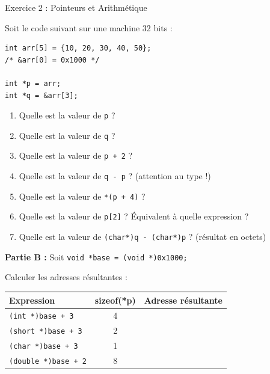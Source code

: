 \documentclass[10pt,a4paper]{article}
\begin{document}
\begin{exercicebox}{Exercice 2 : Pointeurs et Arithmétique}

Soit le code suivant sur une machine 32 bits :

\begin{lstlisting}[numbers=none]
int arr[5] = {10, 20, 30, 40, 50};
/* &arr[0] = 0x1000 */

int *p = arr;
int *q = &arr[3];
\end{lstlisting}

\begin{enumerate}[label=\alph*)]
    \item Quelle est la valeur de \texttt{p} ?
    \item Quelle est la valeur de \texttt{q} ?
    \item Quelle est la valeur de \texttt{p + 2} ?
    \item Quelle est la valeur de \texttt{q - p} ? (attention au type !)
    \item Quelle est la valeur de \texttt{*(p + 4)} ?
    \item Quelle est la valeur de \texttt{p[2]} ? Équivalent à quelle expression ?
    \item Quelle est la valeur de \texttt{(char*)q - (char*)p} ? (résultat en octets)
\end{enumerate}

\textbf{Partie B :} Soit \texttt{void *base = (void *)0x1000;}

Calculer les adresses résultantes :

\begin{center}
\renewcommand{\arraystretch}{1.3}
\begin{tabular}{|l|c|l|}
\hline
\textbf{Expression} & \textbf{sizeof(*p)} & \textbf{Adresse résultante} \\
\hline
\texttt{(int *)base + 3} & 4 & \\
\hline
\texttt{(short *)base + 3} & 2 & \\
\hline
\texttt{(char *)base + 3} & 1 & \\
\hline
\texttt{(double *)base + 2} & 8 & \\
\hline
\end{tabular}
\end{center}

\end{exercicebox}
\end{document}
